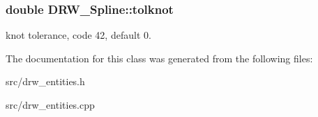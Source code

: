 \subsubsection[{tolknot}]{\setlength{\rightskip}{0pt plus 5cm}double D\+R\+W\+\_\+\+Spline\+::tolknot}\label{class_d_r_w___spline_a62139497f4127ed0d909cbe6cb7d5304}
knot tolerance, code 42, default 0. 

The documentation for this class was generated from the following files\+:\begin{DoxyCompactItemize}
\item 
src/drw\+\_\+entities.\+h\item 
src/drw\+\_\+entities.\+cpp\end{DoxyCompactItemize}
